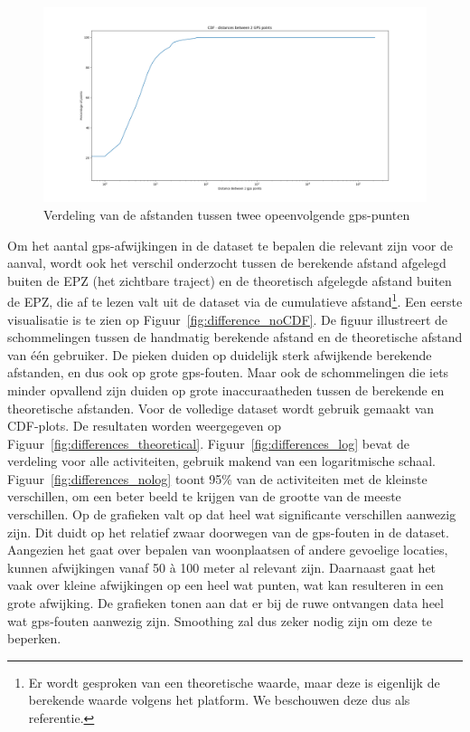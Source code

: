 \begin{figure}
    \centering
    \includegraphics[width=\textwidth]{fig/Afwijkingen&Analyses/Graphs/Afstand tussen 2 gps-punten.png}
    \caption{Verdeling van de afstanden tussen twee opeenvolgende gps-punten}\label{fig:distance_between_gps_points_CDF}
\end{figure}

Om het aantal \ac{gps}-afwijkingen in de dataset te bepalen die relevant zijn
voor de aanval, wordt ook het verschil onderzocht tussen de berekende afstand
afgelegd buiten de \ac{EPZ} (het zichtbare traject) en de theoretisch afgelegde
afstand buiten de \ac{EPZ}, die af te lezen valt uit de dataset via de
cumulatieve afstand\footnote{Er wordt gesproken van een theoretische waarde,
    maar deze is eigenlijk de berekende waarde volgens het platform. We beschouwen
    deze dus als referentie.}. Een eerste visualisatie is te zien op
Figuur~\ref{fig:difference_noCDF}. De figuur illustreert de schommelingen
tussen de handmatig berekende afstand en de theoretische afstand van één
gebruiker. De pieken duiden op duidelijk sterk afwijkende berekende afstanden,
en dus ook op grote \ac{gps}-fouten. Maar ook de schommelingen die iets minder
opvallend zijn duiden op grote inaccuraatheden tussen de berekende en
theoretische afstanden. Voor de volledige dataset wordt gebruik gemaakt van
\ac{CDF}-plots. De resultaten worden weergegeven op
Figuur~\ref{fig:differences_theoretical}. Figuur~\ref{fig:differences_log}
bevat de verdeling voor alle activiteiten, gebruik makend van een logaritmische
schaal. Figuur~\ref{fig:differences_nolog} toont 95\% van de activiteiten met
de kleinste verschillen, om een beter beeld te krijgen van de grootte van de
meeste verschillen. Op de grafieken valt op dat heel wat significante
verschillen aanwezig zijn. Dit duidt op het relatief zwaar doorwegen van de
\ac{gps}-fouten in de dataset. Aangezien het gaat over bepalen van woonplaatsen
of andere gevoelige locaties, kunnen afwijkingen vanaf 50 à 100 meter al
relevant zijn. Daarnaast gaat het vaak over kleine afwijkingen op een heel wat
punten, wat kan resulteren in een grote afwijking. De grafieken tonen aan dat
er bij de ruwe ontvangen data heel wat \ac{gps}-fouten aanwezig zijn. Smoothing
zal dus zeker nodig zijn om deze te beperken.

